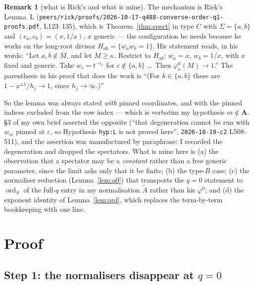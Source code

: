 \documentclass[11pt]{article}
\theoremstyle{plain}
\theoremstyle{definition}
\newtheorem{rem}[thm]{Remark}
\newcommand{\At}{\widetilde{A}}
\newcommand{\bA}{\mathbf{A}}
\newcommand{\ord}{\operatorname{ord}}
\begin{document}
\begin{rem}[what is Rick's and what is mine]\label{rem:credit}
The mechanism is Rick's Lemma~L
(\texttt{peers/rick/proofs/2026-10-17-q488-converse-order-q1-proofs.pdf},
L123--135), which is Theorem~\ref{thm:spect} in type $C$ with $\Sigma=\{a,b\}$
and $(c_a,c_b)=(x,1/x)$, $x$ generic --- the configuration he needs because he
works on the long-root divisor $H_{ab}=\{w_aw_b=1\}$.  His statement reads, in
his words: ``Let $a,b\notin M$, and let $M\ge\kappa$.  Restrict to $H_{ab}$:
$w_a=x$, $w_b=1/x$, with $x$ fixed and generic.  Take $w_c=t^{-e_c}$ for
$c\notin\{a,b\}$ \dots\ Then $\varphi^{0}_{\kappa}(M)\to1$.''  The parenthesis in
his proof that does the work is ``(For $k\in\{a,b\}$ these are
$1-x^{\pm1}/h_j\to1$, since $h_j\to\infty$.)''

So the lemma was always stated \emph{with} pinned coordinates, and with the
pinned indices excluded from the row index --- which is verbatim my hypothesis
$m\notin\bA$.  \S3 of my own brief asserted the opposite (``that degeneration
cannot be run with $w_m$ pinned at $\varepsilon$, so Hypothesis \texttt{hyp:L} is
not proved here'', \texttt{2026-10-19-c2} L508--511), and the assertion was
manufactured by paraphrase: I recorded the degeneration and dropped the
spectators.  What is mine here is (a) the observation that a spectator may be a
\emph{constant} rather than a free generic parameter, since the limit asks only
that it be finite; (b) the type-$B$ case; (c) the normaliser reduction
(Lemma~\ref{lem:q0}) that transports the $q=0$ statement to $\ord_S$ of the
full-$q$ entry in my normalisation $\At$ rather than his $\varphi^0$; and (d) the
exponent identity of Lemma~\ref{lem:ord}, which replaces the term-by-term
bookkeeping with one line.
\end{rem}

\section{Proof}

\subsection{Step 1: the normalisers disappear at $q=0$}
\end{document}
